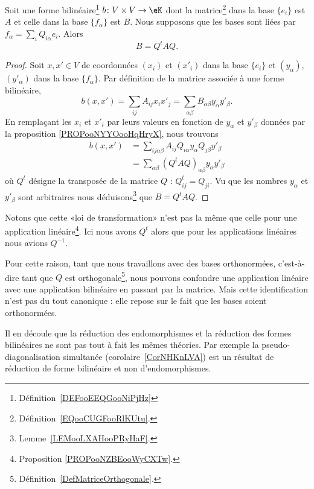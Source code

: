 \begin{proposition}     \label{PROPooLBIOooUpzxXA}
    Soit une forme bilinéaire\footnote{Définition~\ref{DEFooEEQGooNiPjHz}} \( b\colon V\times V\to \eK\) dont la matrice\footnote{Définition~\ref{EQooCUGFooRlKUtu}.} dans la base \( \{ e_i \}\) est \( A\) et celle dans la base \( \{ f_{\alpha} \}\) est \( B\). Nous supposons que les bases sont liées par \( f_{\alpha}=\sum_{i}Q_{i\alpha}e_i\). Alors
\begin{equation}        \label{EQooZUVTooKjqnJj}
    B=Q^tAQ.
\end{equation}
\end{proposition}

\begin{proof}
    Soit \( x,x'\in V\) de coordonnées \( (x_i)\) et \( (x'_i)\) dans la base \( \{ e_i \}\) et \( (y_{\alpha})\), \( (y'_{\alpha})\) dans la base \( \{ f_{\alpha} \}\). Par définition de la matrice associée à une forme bilinéaire,
    \begin{equation}
        b(x,x')=\sum_{ij}A_{ij}x_ix'_j=\sum_{\alpha\beta}B_{\alpha\beta}y_{\alpha}y'_{\beta}.
    \end{equation}
    En remplaçant les \( x_i\) et \( x'_i\) par leurs valeurs en fonction de \( y_{\alpha}\) et \( y'_{\beta}\) données par la proposition \ref{PROPooNYYOooHqHryX}, nous trouvons
    \begin{subequations}
        \begin{align}
            b(x,x')&=\sum_{ij\alpha\beta}A_{ij}Q_{i\alpha}y_{\alpha}Q_{j\beta}y'_{\beta}\\
            &=\sum_{\alpha\beta}(Q^tAQ)_{\alpha\beta}y_{\alpha}y'_{\beta}
        \end{align}
    \end{subequations}
    où \( Q^t\) désigne la transposée de la matrice \( Q\) :  \( Q^t_{ij}=Q_{ji}\). Vu que les nombres \( y_{\alpha}\) et \( y'_{\beta}\) sont arbitraires nous déduisons\footnote{Lemme~\ref{LEMooLXAHooPRyHaF}.} que \( B=Q^tAQ\).
\end{proof}

\begin{remark}      \label{REMooNEJLooSqgeih}
    Notons que cette «loi de transformation» n'est pas la même que celle pour une application linéaire\footnote{Proposition \ref{PROPooNZBEooWyCXTw}.}. Ici nous avons \( Q^t\) alors que pour les applications linéaires nous avions \( Q^{-1}\).

    Pour cette raison, tant que nous travaillons avec des bases orthonormées, c'est-à-dire tant que \( Q\) est orthogonale\footnote{Définition~\ref{DefMatriceOrthogonale}.}, nous pouvons confondre une application linéaire avec une application bilinéaire en passant par la matrice. Mais cette identification n'est pas du tout canonique : elle repose sur le fait que les bases soient orthonormées.

    Il en découle que la réduction des endomorphismes et la réduction des formes bilinéaires ne sont pas tout à fait les mêmes théories. Par exemple la pseudo-diagonalisation simultanée (corolaire~\ref{CorNHKnLVA}) est un résultat de réduction de forme bilinéaire et non d'endomorphismes.
\end{remark}

